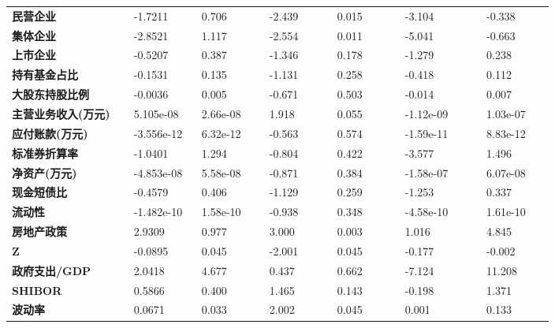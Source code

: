 \begin{center}
\begin{longtable}{p{0.18\linewidth}p{0.1\linewidth}p{0.1\linewidth}p{0.1\linewidth}p{0.1\linewidth}p{0.12\linewidth}p{0.1\linewidth}}
		\textbf{民营企业}           & -1.7211       & 0.706            & -2.439     & 0.015          & -3.104          & -0.338          \\
		\textbf{集体企业}           & -2.8521       & 1.117            & -2.554     & 0.011          & -5.041          & -0.663          \\
		\textbf{上市企业}           & -0.5207       & 0.387            & -1.346     & 0.178          & -1.279          & 0.238           \\
		\textbf{持有基金占比}       & -0.1531       & 0.135            & -1.131     & 0.258          & -0.418          & 0.112           \\
		\textbf{大股东持股比例}     & -0.0036       & 0.005            & -0.671     & 0.503          & -0.014          & 0.007           \\
		\textbf{主营业务收入(万元)} & 5.105e-08     & 2.66e-08         & 1.918      & 0.055          & -1.12e-09       & 1.03e-07        \\
		\textbf{应付账款(万元)}     & -3.556e-12    & 6.32e-12         & -0.563     & 0.574          & -1.59e-11       & 8.83e-12        \\
		\textbf{标准券折算率}       & -1.0401       & 1.294            & -0.804     & 0.422          & -3.577          & 1.496           \\
		\textbf{净资产(万元)}       & -4.853e-08    & 5.58e-08         & -0.871     & 0.384          & -1.58e-07       & 6.07e-08        \\
		\textbf{现金短债比}         & -0.4579       & 0.406            & -1.129     & 0.259          & -1.253          & 0.337           \\
		\textbf{流动性}             & -1.482e-10    & 1.58e-10         & -0.938     & 0.348          & -4.58e-10       & 1.61e-10        \\
		\textbf{房地产政策}         & 2.9309        & 0.977            & 3.000      & 0.003          & 1.016           & 4.845           \\
		\textbf{Z}                  & -0.0895       & 0.045            & -2.001     & 0.045          & -0.177          & -0.002          \\
		\textbf{政府支出/GDP}       & 2.0418        & 4.677            & 0.437      & 0.662          & -7.124          & 11.208          \\
		\textbf{SHIBOR}             & 0.5866        & 0.400            & 1.465      & 0.143          & -0.198          & 1.371           \\
		\textbf{波动率}             & 0.0671        & 0.033            & 2.002      & 0.045          & 0.001           & 0.133           \\
		\bottomrule
	\end{longtable}

\end{center}
